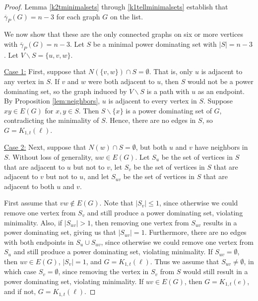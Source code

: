 \documentclass{article}
\numberwithin{figure}{section}   %
\theoremstyle{definition}
\theoremstyle{definition}
\theoremstyle{definition}
\newcommand{\ol}{\overline}
\newcommand{\pd}{\gamma_P}
\newcommand{\pdbar}{\ol\pd}
\begin{document}
\begin{proof}
Lemma \ref{k2tminimalsets} through \ref{k1tellminimalsets} establish that $\pdbar(G)=n-3$ for each graph $G$ on the list.  

We now show that these are the only connected graphs on six or more vertices with $\pdbar(G)=n-3$.  Let $S$ be a minimal power dominating set with $|S|=n-3$.  Let $V\backslash S = \{u, v, w\}$.  



\underline{Case 1:} First, suppose that $N(\{v, w\}) \cap S = \emptyset$.  That is, only $u$ is adjacent to any vertex in $S$.  If $v$ and $w$ were both adjacent to $u$, then $S$ would not be a power dominating set, so  the graph induced by $V \backslash S$ is a path with $u$ as an endpoint.  By Proposition \ref{lem:neighbors},  $u$ is adjacent to every vertex in $S$.  Suppose $xy \in E(G)$ for $x, y \in S$.  Then $S \backslash \{x\}$ is a power dominating set of $G$, contradicting the minimality of $S$.  Hence, there are no edges in $S$, so $G=K_{1,t}(\ell)$. %

\underline{Case 2:}  
Next, suppose that $N(w) \cap S = \emptyset$, but both $u$ and $v$ have neighbors in $S$.  Without loss of generality, $uw \in E(G)$.  Let $S_u$ be the set of vertices in $S$ that are adjacent to $u$ but not to $v$, let $S_v$ be the set of vertices in $S$ that are adjacent to $v$ but not to $u$, and let $S_{uv}$ be the set of vertices in $S$ that are adjacent to both $u$ and $v$.


First assume that $vw \notin E(G)$.  Note that  $|S_v| \leq 1$, since otherwise we could remove one vertex from  $S_v$ and still produce a power dominating set, violating minimality.  {Also, if $|S_{uv}| >1$, then removing one vertex from $S_{uv}$ results in a power dominating set, giving us that $|S_{uv}|=1$. Furthermore, there are no edges with both endpoints in $S_u\cup S_{uv}$,} since otherwise we could remove one vertex from {$S_u$}  and still produce a power dominating set, violating minimality.  If $S_{uv} = \emptyset$, then $uv\in E(G)$, $|S_v|=1$, and $G=K_{1,t}(\ell)$.  %
Thus we assume that $S_{uv} \neq \emptyset$, in which case $S_v = \emptyset$, since removing {the vertex in $S_v$} from $S$ would still result in a power dominating set, violating minimality.    If $uv \in E(G)$, then $G=K_{1,t}(e)$, and if not, $G=K_{1,t}(\ell)$. %



\end{proof}
\end{document}
